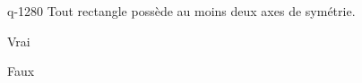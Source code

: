 \begin{truefalse}{q-1280}
Tout rectangle possède au moins deux axes de symétrie.
\item* Vrai
\item Faux
\end{truefalse}

